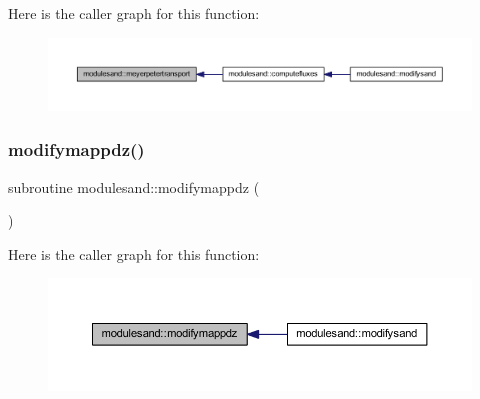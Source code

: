 Here is the caller graph for this function\+:\nopagebreak
\begin{figure}[H]
\begin{center}
\leavevmode
\includegraphics[width=350pt]{namespacemodulesand_a127d449cfb0928af3dd2e7b348aca9cc_icgraph}
\end{center}
\end{figure}
\mbox{\label{namespacemodulesand_a49934851385611f48a356e02d5c0f1e1}} 
\subsubsection{\texorpdfstring{modifymappdz()}{modifymappdz()}}
{\footnotesize\ttfamily subroutine modulesand\+::modifymappdz (\begin{DoxyParamCaption}{ }\end{DoxyParamCaption})\hspace{0.3cm}{\ttfamily [private]}}

Here is the caller graph for this function\+:\nopagebreak
\begin{figure}[H]
\begin{center}
\leavevmode
\includegraphics[width=350pt]{namespacemodulesand_a49934851385611f48a356e02d5c0f1e1_icgraph}
\end{center}
\end{figure}
\mbox{\label{namespacemodulesand_a72127773a460332746476a09b3380e49}} 
